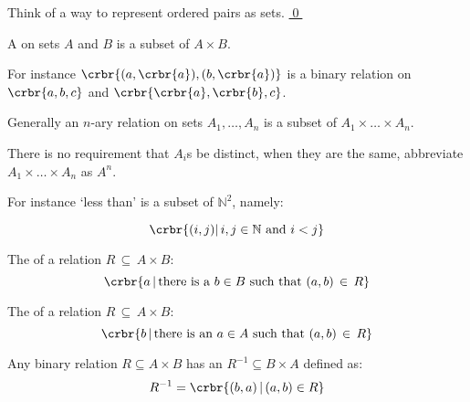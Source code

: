 \documentclass[11pt]{article}
\begin{document}
{\begin{uexercise}[*]\label{exrepres}
 Think of a way to represent ordered pairs as sets.
\hyperlink{exrepressol}{\qed}
\end{uexercise}
\hrulefill

\item A  on sets $A$ and $B$ is a subset of $A \times B$.  

\item[] For instance $\crbr{(a,\crbr{a}),(b,\crbr{a})}$  is a binary relation on
$\crbr{a,b,c}$ and $\crbr{\crbr{a},\crbr{b},c}$.

\item Generally an $n$-ary relation on sets $A_1,\ldots,A_n$ is a subset of
$A_1\times\ldots\times A_n$.


\item There is no requirement that $A_i$s  be distinct, when they are the same,
abbreviate $A_1\times\ldots\times A_n$ as $A^n$.

\item[] For instance `less than' is a subset of $\mathbb{N}^2$, namely:

\[
\crbr{(i,j) |\, i,j \in \mathbb{N} \text{ and } i < j}
\]

\item The  of a relation $R\, \subseteq\, A\times B$:
\[
	\crbr{a\,|\, \text{there is a } b\in B \text{ such that }  (a,b)\, \in\, R}
\]

\item The  of a relation $R\, \subseteq\, A\times B$:
\[
	\crbr{b\,|\, \text{there is an } a\in A \text{ such that }  (a,b)\, \in\, R}
\]

\item Any binary relation $R\subseteq A\times B$ has an  $R^{-1}
\subseteq B\times A$ defined as:
\[
R^{-1}=\crbr{(b,a)\,|\, (a,b) \in R}
\]

}
\end{document}
